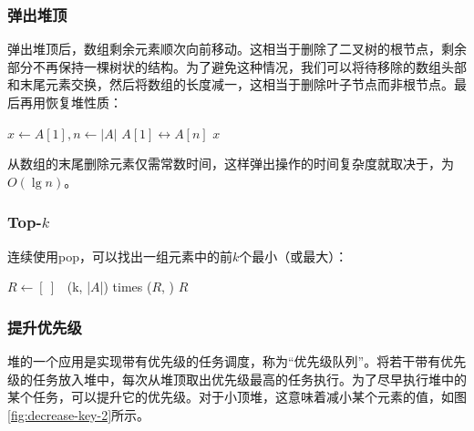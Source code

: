 \documentclass[b5paper]{ctexart}
\begin{document}
\subsubsection{弹出堆顶}
 

弹出堆顶后，数组剩余元素顺次向前移动。这相当于删除了二叉树的根节点，剩余部分不再保持一棵树状的结构。为了避免这种情况，我们可以将待移除的数组头部和末尾元素交换，然后将数组的长度减一，这相当于删除叶子节点而非根节点。最后再用恢复堆性质：

\begin{algorithmic}[1]
  \State $x \gets A [1], n \gets |A|$
  \State {} $A[1] \leftrightarrow A[n]$
  \State {}
    \State {}
  \EndIf
  \State \Return $x$
\EndFunction
\end{algorithmic}

从数组的末尾删除元素仅需常数时间，这样弹出操作的时间复杂度就取决于，为$O(\lg n)$。

\subsubsection{Top-$k$}

连续使用pop，可以找出一组元素中的前$k$个最小（或最大）：

\begin{algorithmic}[1]
  \State $R \gets [\ ]$
  \State {}
  \Loop \ (k, |$A$|) times 
    \State {}($R$, )
  \EndLoop
  \State \Return $R$
\EndFunction
\end{algorithmic}

\subsubsection{提升优先级}

堆的一个应用是实现带有优先级的任务调度，称为“优先级队列”。将若干带有优先级的任务放入堆中，每次从堆顶取出优先级最高的任务执行。为了尽早执行堆中的某个任务，可以提升它的优先级。对于小顶堆，这意味着减小某个元素的值，如图\ref{fig:decrease-key-2}所示。
\end{document}
